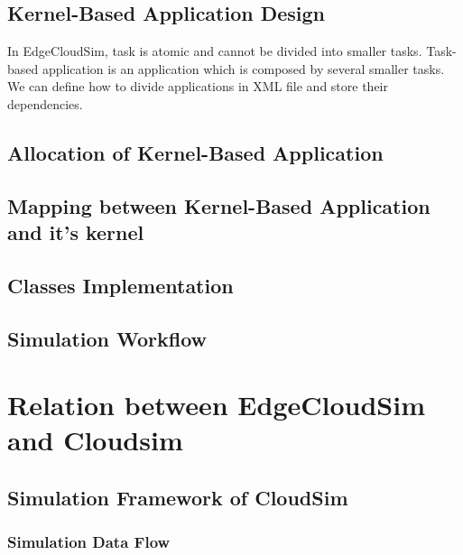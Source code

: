 \subsection{Kernel-Based Application Design}
In EdgeCloudSim, task is atomic and cannot be divided into smaller tasks. Task-based application is an application which is composed by several smaller tasks. We can define how to divide applications in XML file and store their dependencies.


\subsection{Allocation of Kernel-Based Application}


\subsection{Mapping between Kernel-Based Application and it's kernel}


\subsection{Classes Implementation}


\subsection{Simulation Workflow}


\section{Relation between EdgeCloudSim and Cloudsim}

\subsection{Simulation Framework of CloudSim}
\subsubsection{Simulation Data Flow}


